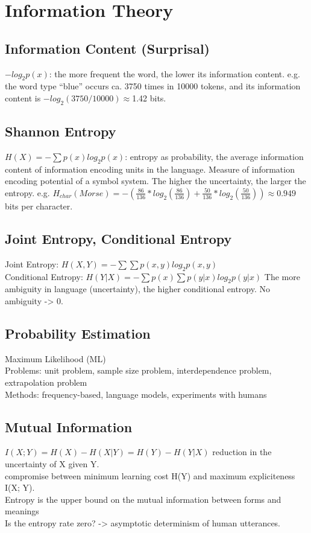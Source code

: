 \section{Information Theory}
\subsection*{Information Content (Surprisal)}
$-log_2 p(x)$: the more frequent the word, the lower its information content.
e.g. the word type “blue” occurs ca. 3750 times in
10000 tokens, and its information content is $-log_2(3750/10000) \approx$1.42 bits.
\subsection*{Shannon Entropy}
$H(X) = - \sum p(x) log_2 p(x)$: entropy as probability, the average information content of information encoding units in the language. Measure of information encoding potential of a symbol system. The higher the uncertainty, the larger the entropy. e.g. $H_{char}(Morse) = - (\frac{86}{136} * log_2(\frac{86}{136}) + \frac{50}{136} * log_2(\frac{50}{136})) \approx 0.949$ bits per character. 
\subsection*{Joint Entropy, Conditional Entropy}
Joint Entropy: $H(X, Y) = - \sum \sum p(x, y) log_2 p(x, y)$ \\
Conditional Entropy: $H(Y|X) = - \sum p(x) \sum p(y|x) log_2 p(y|x)$ The more ambiguity in language (uncertainty), the higher conditional entropy. No ambiguity -> 0.
\subsection*{Probability Estimation}
Maximum Likelihood (ML) \\
Problems: unit problem, sample size problem, interdependence problem, extrapolation problem \\
Methods: frequency-based, language models, experiments with humans
\subsection*{Mutual Information}
$I(X; Y) = H(X) - H(X|Y) = H(Y) - H(Y|X)$ reduction in the uncertainty of X given Y. \\
compromise between minimum learning cost H(Y) and maximum expliciteness I(X; Y). \\
Entropy is the upper bound on the mutual information between forms and meanings \\
Is the entropy rate zero? -> asymptotic determinism of human utterances.